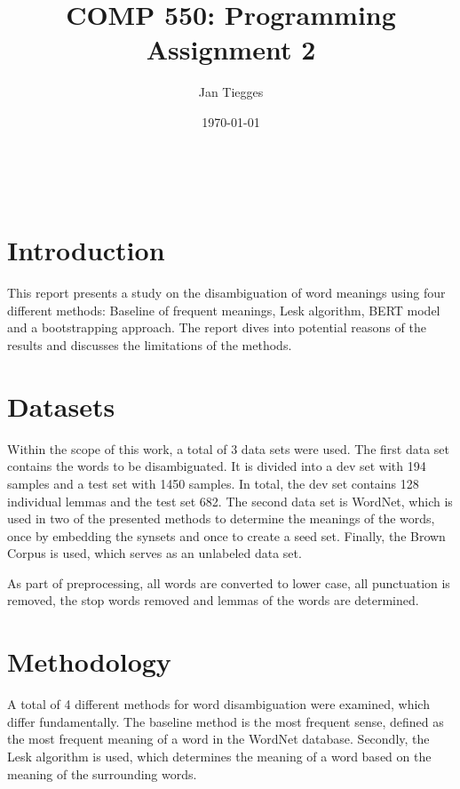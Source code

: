 \documentclass[12pt]{article}
\title{\textbf{COMP 550: Programming Assignment 2}}
\author{Jan Tiegges}
\date{\today}
\makeatletter
\renewcommand{\maketitle}{%
  \begin{center}
    {\large\bfseries\MakeUppercase\@title}\\[1ex]
    \MakeUppercase{\@author \hspace{2em} \@date}
  \end{center}
}
\makeatother
\begin{document}
\maketitle

\section{Introduction}

This report presents a study on the disambiguation of word meanings using four different methods: Baseline of frequent meanings, Lesk algorithm, BERT model and a bootstrapping approach. The report dives into potential reasons of the results and discusses the limitations of the methods.

\section{Datasets}
Within the scope of this work, a total of 3 data sets were used. The first data set contains the words to be disambiguated. It is divided into a dev set with 194 samples and a test set with 1450 samples. In total, the dev set contains 128 individual lemmas and the test set 682. The second data set is WordNet, which is used in two of the presented methods to determine the meanings of the words, once by embedding the synsets and once to create a seed set. Finally, the Brown Corpus is used, which serves as an unlabeled data set. 

As part of preprocessing, all words are converted to lower case, all punctuation is removed, the stop words removed and lemmas of the words are determined.

\section{Methodology}
A total of 4 different methods for word disambiguation were examined, which differ fundamentally. The baseline method is the most frequent sense, defined as the most frequent meaning of a word in the WordNet database. Secondly, the Lesk algorithm is used, which determines the meaning of a word based on the meaning of the surrounding words.
\end{document}
